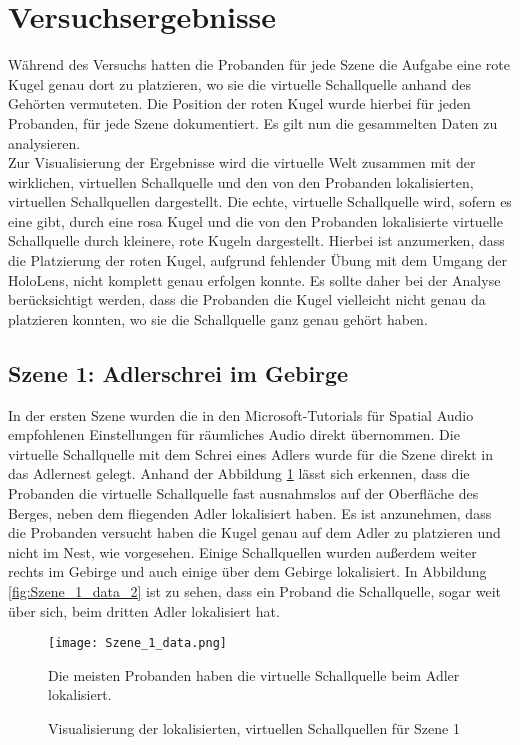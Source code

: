  \section{Versuchsergebnisse}
 Während des Versuchs hatten die Probanden für jede Szene die Aufgabe eine rote Kugel genau dort zu platzieren, wo sie die virtuelle Schallquelle anhand des Gehörten vermuteten. Die Position der roten Kugel wurde hierbei für jeden Probanden, für jede Szene dokumentiert. Es gilt nun die gesammelten Daten zu analysieren. \\
 
 Zur Visualisierung der Ergebnisse wird die virtuelle Welt zusammen mit der wirklichen, virtuellen Schallquelle und den von den Probanden lokalisierten, virtuellen Schallquellen dargestellt. Die echte, virtuelle Schallquelle wird, sofern es eine gibt, durch eine rosa Kugel und die von den Probanden lokalisierte virtuelle Schallquelle durch kleinere, rote Kugeln dargestellt. Hierbei ist anzumerken, dass die Platzierung der roten Kugel, aufgrund fehlender Übung mit dem Umgang der HoloLens, nicht komplett genau erfolgen konnte. Es sollte daher bei der Analyse berücksichtigt werden, dass die Probanden die Kugel vielleicht nicht genau da platzieren konnten, wo sie die Schallquelle ganz genau gehört haben. 
 
 \subsection{Szene 1: Adlerschrei im Gebirge}
 In der ersten Szene wurden die in den Microsoft-Tutorials für Spatial Audio empfohlenen Einstellungen für räumliches Audio direkt übernommen. Die virtuelle Schallquelle mit dem Schrei eines Adlers wurde für die Szene direkt in das Adlernest gelegt. Anhand der Abbildung \ref{fig:Szene_1_data} lässt sich erkennen, dass die Probanden die virtuelle Schallquelle fast ausnahmslos auf der Oberfläche des Berges, neben dem fliegenden Adler lokalisiert haben. Es ist anzunehmen, dass die Probanden versucht haben die Kugel genau auf dem Adler zu platzieren und nicht im Nest, wie vorgesehen. Einige Schallquellen wurden außerdem weiter rechts im Gebirge und auch einige über dem Gebirge lokalisiert. In Abbildung \ref{fig:Szene_1_data_2} ist zu sehen, dass ein Proband die Schallquelle, sogar weit über sich, beim dritten Adler lokalisiert hat. 
 
   \begin{figure}[H]
\centering
\texttt{[image: Szene\_1\_data.png]}
\caption{Visualisierung der lokalisierten, virtuellen Schallquellen für Szene 1}
Die meisten Probanden haben die virtuelle Schallquelle beim Adler lokalisiert. 
\label{fig:Szene_1_data}
\end{figure} 

